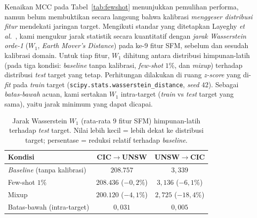 \documentclass[11pt,a4paper]{article}
\begin{document}
Kenaikan MCC pada Tabel~\ref{tab:fewshot} menunjukkan pemulihan performa, namun
belum membuktikan secara langsung bahwa kalibrasi \emph{menggeser distribusi
fitur} mendekati jaringan target. Mengikuti standar yang ditetapkan Layeghy
\emph{et al.}~\cite{layeghy}, kami mengukur jarak statistik secara kuantitatif
dengan \emph{jarak Wasserstein orde-1} ($W_1$, \emph{Earth Mover's Distance})
\cite{wasserstein} pada ke-9 fitur SFM, sebelum dan sesudah kalibrasi domain.
Untuk tiap fitur, $W_1$ dihitung antara distribusi himpunan-latih (pada tiga
kondisi: \emph{baseline} tanpa kalibrasi, \emph{few-shot} $1\%$, dan
\emph{mixup}) terhadap distribusi \emph{test} target yang tetap. Perhitungan
dilakukan di ruang \emph{z-score} yang di-\emph{fit} pada \emph{train} target
(\texttt{scipy.stats.wasserstein\_distance}, \emph{seed} $42$). Sebagai
\emph{batas-bawah} acuan, kami sertakan $W_1$ intra-target (\emph{train} vs
\emph{test} target yang sama), yaitu jarak minimum yang dapat dicapai.

\begin{table}[h]
\centering
\caption{Jarak Wasserstein $W_1$ (rata-rata 9 fitur SFM) himpunan-latih terhadap
\emph{test} target. Nilai lebih kecil = lebih dekat ke distribusi target;
persentase = reduksi relatif terhadap \emph{baseline}.}
\label{tab:wass}
\begin{tabular}{lcc}
\toprule
Kondisi & CIC$\rightarrow$UNSW & UNSW$\rightarrow$CIC \\
\midrule
\emph{Baseline} (tanpa kalibrasi) & $208{.}757$ & $3{,}339$ \\
Few-shot $1\%$        & $208{.}436$ ($-0{,}2\%$) & $3{,}136$ ($-6{,}1\%$) \\
Mixup                 & $200{.}120$ ($-4{,}1\%$) & $2{,}725$ ($-18{,}4\%$) \\
\midrule
Batas-bawah (intra-target) & $0{,}031$ & $0{,}005$ \\
\bottomrule
\end{tabular}
\end{table}
\end{document}
